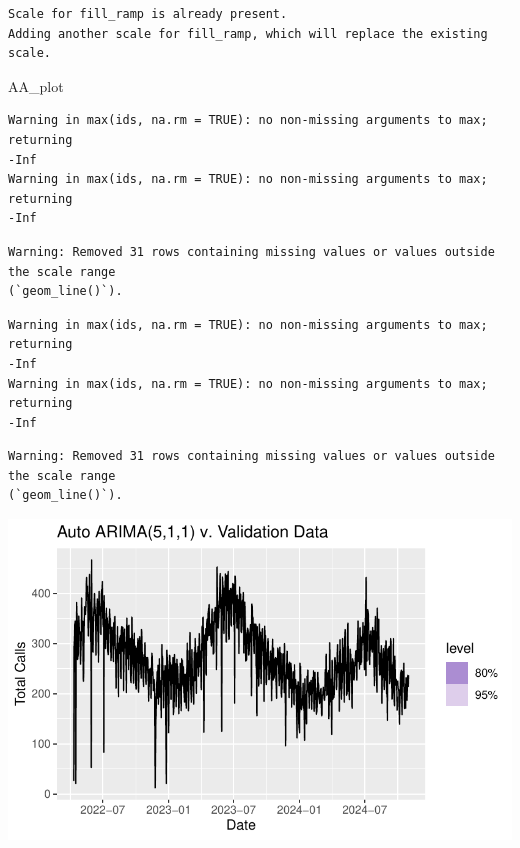 \documentclass[
  letterpaper,
  DIV=11,
  numbers=noendperiod]{scrartcl}
\newenvironment{Shaded}{\begin{snugshade}}{\end{snugshade}}
\newcommand{\NormalTok}[1]{\textcolor[rgb]{0.00,0.23,0.31}{#1}}
\begin{document}
\begin{verbatim}
Scale for fill_ramp is already present.
Adding another scale for fill_ramp, which will replace the existing scale.
\end{verbatim}

\begin{Shaded}
\begin{Highlighting}[]
\NormalTok{AA\_plot}
\end{Highlighting}
\end{Shaded}

\begin{verbatim}
Warning in max(ids, na.rm = TRUE): no non-missing arguments to max; returning
-Inf
Warning in max(ids, na.rm = TRUE): no non-missing arguments to max; returning
-Inf
\end{verbatim}

\begin{verbatim}
Warning: Removed 31 rows containing missing values or values outside the scale range
(`geom_line()`).
\end{verbatim}

\begin{verbatim}
Warning in max(ids, na.rm = TRUE): no non-missing arguments to max; returning
-Inf
Warning in max(ids, na.rm = TRUE): no non-missing arguments to max; returning
-Inf
\end{verbatim}

\begin{verbatim}
Warning: Removed 31 rows containing missing values or values outside the scale range
(`geom_line()`).
\end{verbatim}

\includegraphics{final_proj_group1_files/figure-pdf/visualize_AARIMA-1.pdf}
\end{document}
